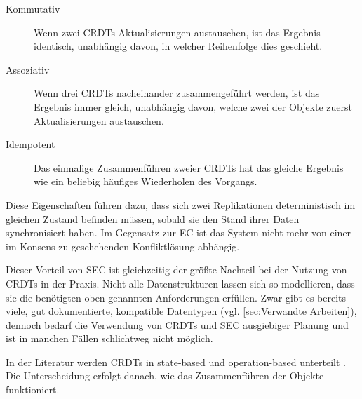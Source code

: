 \documentclass[a4paper, 12pt]{scrreprt}
\begin{document}
\begin{description}
	\label{sec:kommuassoidem}
	\item[Kommutativ] Wenn zwei CRDTs Aktualisierungen austauschen, ist das Ergebnis identisch, unabhängig davon, in welcher Reihenfolge dies geschieht.%
	\item[Assoziativ] Wenn drei CRDTs nacheinander zusammengeführt werden, ist das Ergebnis immer gleich, unabhängig davon, welche zwei der Objekte zuerst Aktualisierungen austauschen.%
	\item[Idempotent] Das einmalige Zusammenführen zweier CRDTs hat das gleiche Ergebnis wie ein beliebig häufiges Wiederholen des Vorgangs.%
\end{description}

Diese Eigenschaften führen dazu, dass sich zwei Replikationen deterministisch im gleichen Zustand befinden müssen, sobald sie den Stand ihrer Daten synchronisiert haben. Im Gegensatz zur \ac{EC} ist das System nicht mehr von einer im Konsens zu geschehenden Konfliktlösung abhängig. 

Dieser Vorteil von \ac{SEC} ist gleichzeitig der größte Nachteil bei der Nutzung von CRDTs in der Praxis. Nicht alle Datenstrukturen lassen sich so modellieren, dass sie die benötigten oben genannten Anforderungen erfüllen. Zwar gibt es bereits viele, gut dokumentierte, kompatible Datentypen (vgl. \ref{sec:Verwandte Arbeiten}), dennoch bedarf die Verwendung von CRDTs und \ac{SEC} ausgiebiger Planung und ist in manchen Fällen schlichtweg nicht möglich.

In der Literatur werden CRDTs in state-based und operation-based unterteilt \autocite[S. 10]{ArticleOptimisticReplication}. Die Unterscheidung erfolgt danach, wie das Zusammenführen der Objekte funktioniert.
\end{document}

